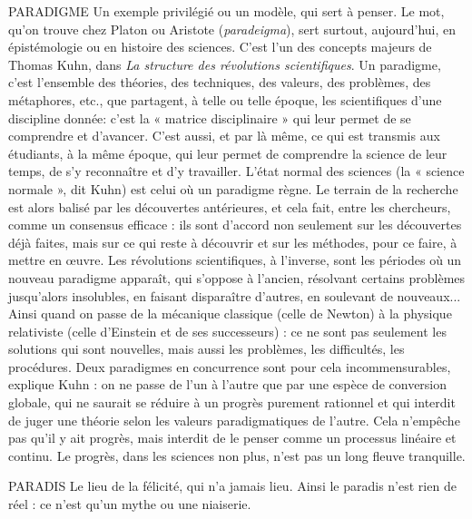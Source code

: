 PARADIGME Un exemple privilégié ou un modèle, qui sert à penser. Le mot,
qu’on trouve chez Platon ou Aristote ({\it paradeigma}), sert surtout,
aujourd’hui, en épistémologie ou en histoire des sciences. C’est l’un des
concepts majeurs de Thomas Kuhn, dans {\it La structure des révolutions scientifiques}.
Un paradigme, c’est l’ensemble des théories, des techniques, des
valeurs, des problèmes, des métaphores, etc., que partagent, à telle ou telle
époque, les scientifiques d’une discipline donnée: c’est la « matrice
disciplinaire » qui leur permet de se comprendre et d’avancer. C’est aussi, et
par là même, ce qui est transmis aux étudiants, à la même époque, qui leur
permet de comprendre la science de leur temps, de s’y reconnaître et d’y travailler.
L'état normal des sciences (la « science normale », dit Kuhn) est celui
où un paradigme règne. Le terrain de la recherche est alors balisé par les
découvertes antérieures, et cela fait, entre les chercheurs, comme un
consensus efficace : ils sont d’accord non seulement sur les découvertes déjà
faites, mais sur ce qui reste à découvrir et sur les méthodes, pour ce faire, à
mettre en œuvre. Les révolutions scientifiques, à l’inverse, sont les périodes
où un nouveau paradigme apparaît, qui s’oppose à l’ancien, résolvant certains
problèmes jusqu’alors insolubles, en faisant disparaître d’autres, en soulevant
de nouveaux... Ainsi quand on passe de la mécanique classique (celle de
Newton) à la physique relativiste (celle d’Einstein et de ses successeurs) : ce
ne sont pas seulement les solutions qui sont nouvelles, mais aussi les problèmes,
les difficultés, les procédures. Deux paradigmes en concurrence sont
pour cela incommensurables, explique Kuhn : on ne passe de l’un à l’autre
que par une espèce de conversion globale, qui ne saurait se réduire à un progrès
purement rationnel et qui interdit de juger une théorie selon les valeurs
paradigmatiques de l’autre. Cela n'empêche pas qu’il y ait progrès, mais
interdit de le penser comme un processus linéaire et continu. Le progrès,
dans les sciences non plus, n’est pas un long fleuve tranquille.

PARADIS Le lieu de la félicité, qui n’a jamais lieu. Ainsi le paradis n’est rien
de réel : ce n’est qu’un mythe ou une niaiserie.

